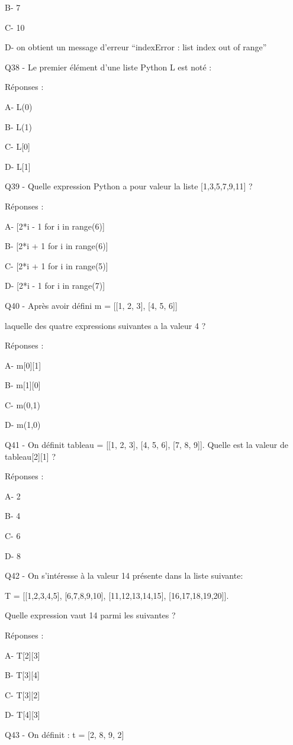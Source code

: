 \documentclass[
]{book}
\begin{document}
B- 7

C- 10

D- on obtient un message d'erreur ``indexError : list index out of range''

Q38 - Le premier élément d'une liste Python L est noté :

Réponses :

A- L(0)

B- L(1)

C- L{[}0{]}

D- L{[}1{]}

Q39 - Quelle expression Python a pour valeur la liste {[}1,3,5,7,9,11{]} ?

Réponses :

A- {[}2*i - 1 for i in range(6){]}

B- {[}2*i + 1 for i in range(6){]}

C- {[}2*i + 1 for i in range(5){]}

D- {[}2*i - 1 for i in range(7){]}

Q40 - Après avoir défini m = {[}{[}1, 2, 3{]}, {[}4, 5, 6{]}{]}

laquelle des quatre expressions suivantes a la valeur 4 ?

Réponses :

A- m{[}0{]}{[}1{]}

B- m{[}1{]}{[}0{]}

C- m(0,1)

D- m(1,0)

Q41 - On définit tableau = {[}{[}1, 2, 3{]}, {[}4, 5, 6{]}, {[}7, 8, 9{]}{]}. Quelle est la valeur de tableau{[}2{]}{[}1{]} ?

Réponses :

A- 2

B- 4

C- 6

D- 8

Q42 - On s'intéresse à la valeur 14 présente dans la liste suivante:

T = {[}{[}1,2,3,4,5{]}, {[}6,7,8,9,10{]}, {[}11,12,13,14,15{]}, {[}16,17,18,19,20{]}{]}.

Quelle expression vaut 14 parmi les suivantes ?

Réponses :

A- T{[}2{]}{[}3{]}

B- T{[}3{]}{[}4{]}

C- T{[}3{]}{[}2{]}

D- T{[}4{]}{[}3{]}

Q43 - On définit : t = {[}2, 8, 9, 2{]}
\end{document}

